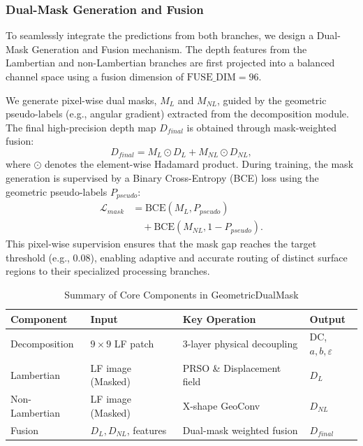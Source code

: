 \subsubsection{Dual-Mask Generation and Fusion}
To seamlessly integrate the predictions from both branches, we design a Dual-Mask Generation and Fusion mechanism. The depth features from the Lambertian and non-Lambertian branches are first projected into a balanced channel space using a fusion dimension of $\text{FUSE\_DIM}=96$. 

We generate pixel-wise dual masks, $M_L$ and $M_{NL}$, guided by the geometric pseudo-labels (e.g., angular gradient) extracted from the decomposition module. The final high-precision depth map $D_{final}$ is obtained through mask-weighted fusion:
\begin{equation}
    D_{final} = M_L \odot D_L + M_{NL} \odot D_{NL},
    \label{eq:ch3_4}
\end{equation}
where $\odot$ denotes the element-wise Hadamard product. During training, the mask generation is supervised by a Binary Cross-Entropy (BCE) loss using the geometric pseudo-labels $P_{pseudo}$:
\begin{align}
    \mathcal{L}_{mask} &= \text{BCE}(M_L, P_{pseudo}) \nonumber \\
    &\quad + \text{BCE}(M_{NL}, 1 - P_{pseudo}).
    \label{eq:ch3_5}
\end{align}
This pixel-wise supervision ensures that the mask gap reaches the target threshold (e.g., $0.08$), enabling adaptive and accurate routing of distinct surface regions to their specialized processing branches.

\begin{table}[!t]
\centering
\caption{Summary of Core Components in GeometricDualMask}
\label{tab:core_components}
\begin{tabular}{@{}llll@{}}
\toprule
\textbf{Component} & \textbf{Input} & \textbf{Key Operation} & \textbf{Output} \\
\midrule
Decomposition & $9 \times 9$ LF patch & 3-layer physical decoupling & DC, $a, b, \varepsilon$ \\
Lambertian & LF image (Masked) & PRSO \& Displacement field & $D_L$ \\
Non-Lambertian & LF image (Masked) & X-shape GeoConv & $D_{NL}$ \\
Fusion & $D_L, D_{NL}$, features & Dual-mask weighted fusion & $D_{final}$ \\
\bottomrule
\end{tabular}
\end{table}

